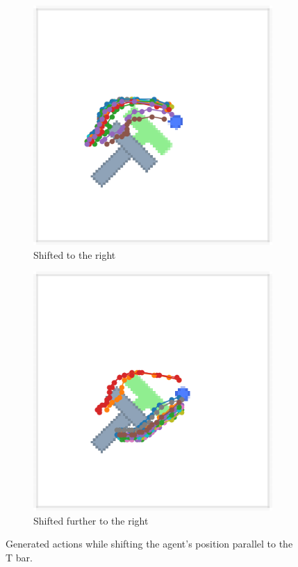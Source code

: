 \begin{figure}[!htb]
    \begin{subfigure}[b]{0.4\linewidth}
        \centering
        \includegraphics[width=\linewidth]{figures/multimodality_shifted.png}
        \caption{Shifted to the right}
    \end{subfigure}
    \begin{subfigure}[b]{0.4\linewidth}
        \centering
        \includegraphics[width=\linewidth]{figures/multimodality_shifted+.png}
        \caption{Shifted further to the right}
    \end{subfigure}
    \caption{Generated actions while shifting the agent's position parallel to the T bar.}
    \label{fig:multimodality_experiment}
\end{figure}
